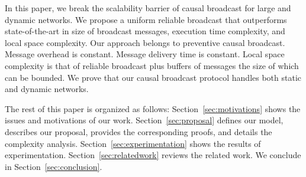 In this paper, we break the scalability barrier of causal broadcast for large
and dynamic networks. We propose a uniform reliable broadcast that outperforms
state-of-the-art in size of broadcast messages, execution time complexity, and
local space complexity. Our approach belongs to preventive causal
broadcast. Message overhead is constant. Message delivery time is
constant. Local space complexity is that of reliable broadcast plus buffers of
messages the size of which can be bounded.
We prove that our causal broadcast protocol handles both static and dynamic
networks. 


The rest of this paper is organized as follows: Section~\ref{sec:motivations}
shows the issues and motivations of our work. %
Section~\ref{sec:proposal} defines our model, describes our proposal, provides
the corresponding proofs, and details the complexity
analysis. Section~\ref{sec:experimentation} shows the results of
experimentation.  Section~\ref{sec:relatedwork} reviews the related work. We
conclude in Section~\ref{sec:conclusion}.




